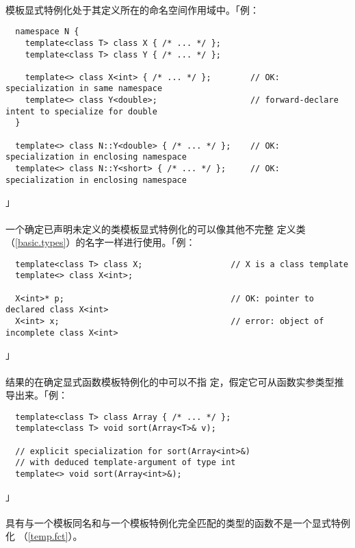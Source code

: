 \paragraph{}
模板显式特例化处于其定义所在的命名空间作用域中。「例：
\begin{lstlisting}
  namespace N {
    template<class T> class X { /* ... */ };
    template<class T> class Y { /* ... */ };

    template<> class X<int> { /* ... */ };        // OK: specialization in same namespace
    template<> class Y<double>;                   // forward-declare intent to specialize for double
  }

  template<> class N::Y<double> { /* ... */ };    // OK: specialization in enclosing namespace
  template<> class N::Y<short> { /* ... */ };     // OK: specialization in enclosing namespace
\end{lstlisting}」

\paragraph{}
一个确定已声明未定义的类模板显式特例化的可以像其他不完整
定义类（\ref{basic.types}）的名字一样进行使用。「例：
\begin{lstlisting}
  template<class T> class X;                  // X is a class template
  template<> class X<int>;

  X<int>* p;                                  // OK: pointer to declared class X<int>
  X<int> x;                                   // error: object of incomplete class X<int>
\end{lstlisting}」

\paragraph{}
结果的在确定显式函数模板特例化的中可以不指
定，假定它可从函数实参类型推导出来。「例：
\begin{lstlisting}
  template<class T> class Array { /* ... */ };
  template<class T> void sort(Array<T>& v);

  // explicit specialization for sort(Array<int>&)
  // with deduced template-argument of type int
  template<> void sort(Array<int>&);
\end{lstlisting}」

\paragraph{}
具有与一个模板同名和与一个模板特例化完全匹配的类型的函数不是一个显式特例化
（\ref{temp.fct}）。

